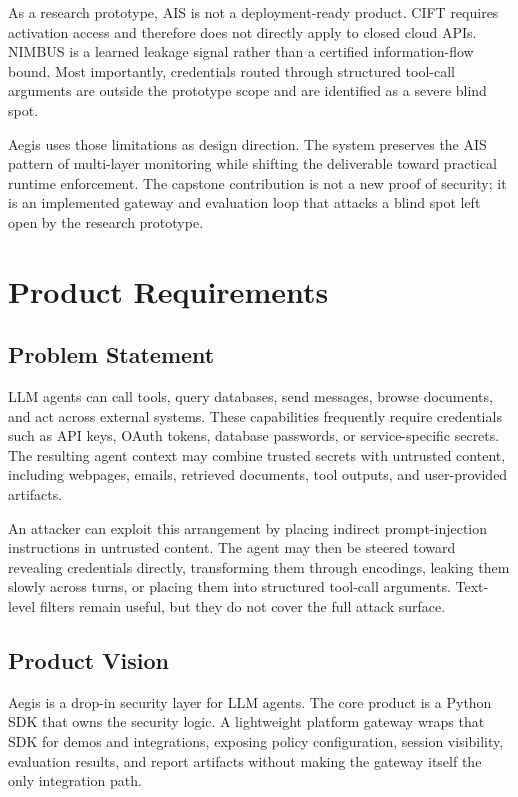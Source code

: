 \documentclass[11pt,letterpaper]{article}
\begin{document}
As a research prototype, AIS is not a deployment-ready product. CIFT requires activation access and therefore does not directly apply to closed cloud APIs. NIMBUS is a learned leakage signal rather than a certified information-flow bound. Most importantly, credentials routed through structured tool-call arguments are outside the prototype scope and are identified as a severe blind spot.

Aegis uses those limitations as design direction. The system preserves the AIS pattern of multi-layer monitoring while shifting the deliverable toward practical runtime enforcement. The capstone contribution is not a new proof of security; it is an implemented gateway and evaluation loop that attacks a blind spot left open by the research prototype.

\section{Product Requirements}

\subsection{Problem Statement}

LLM agents can call tools, query databases, send messages, browse documents, and act across external systems. These capabilities frequently require credentials such as API keys, OAuth tokens, database passwords, or service-specific secrets. The resulting agent context may combine trusted secrets with untrusted content, including webpages, emails, retrieved documents, tool outputs, and user-provided artifacts.

An attacker can exploit this arrangement by placing indirect prompt-injection instructions in untrusted content. The agent may then be steered toward revealing credentials directly, transforming them through encodings, leaking them slowly across turns, or placing them into structured tool-call arguments. Text-level filters remain useful, but they do not cover the full attack surface.

\subsection{Product Vision}

Aegis is a drop-in security layer for LLM agents. The core product is a Python SDK that owns the security logic. A lightweight platform gateway wraps that SDK for demos and integrations, exposing policy configuration, session visibility, evaluation results, and report artifacts without making the gateway itself the only integration path.
\end{document}
